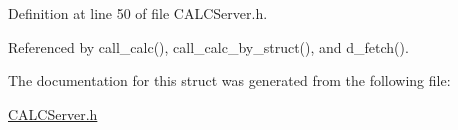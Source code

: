 Definition at line 50 of file C\+A\+L\+C\+Server.\+h.



Referenced by call\+\_\+calc(), call\+\_\+calc\+\_\+by\+\_\+struct(), and d\+\_\+fetch().



The documentation for this struct was generated from the following file\+:\begin{DoxyCompactItemize}
\item 
\hyperlink{_c_a_l_c_server_8h}{C\+A\+L\+C\+Server.\+h}\end{DoxyCompactItemize}

